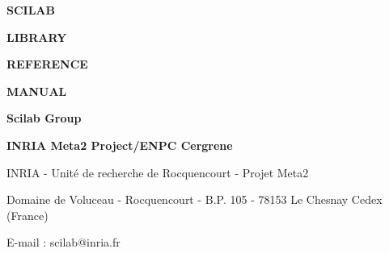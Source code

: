 
\pagestyle{empty}


\newpage

\vspace{8.cm}

{\Huge\bf  {SCILAB}}

\bigskip

{\Huge\bf  {LIBRARY}}

\bigskip

{\Huge\bf  {REFERENCE}}

\bigskip

{\Huge\bf  {MANUAL}}

\vspace{3.cm}

{\Huge\bf {Scilab Group}}


{\Large\bf
INRIA Meta2 Project/ENPC Cergrene}

\normalsize

\vspace{12.cm}

INRIA - Unit\'e de recherche de Rocquencourt - Projet Meta2

Domaine de Voluceau - Rocquencourt - B.P. 105 - 78153 Le Chesnay Cedex (France)

E-mail : scilab@inria.fr

\normalsize

\tableofcontents

\pagestyle{headings}

